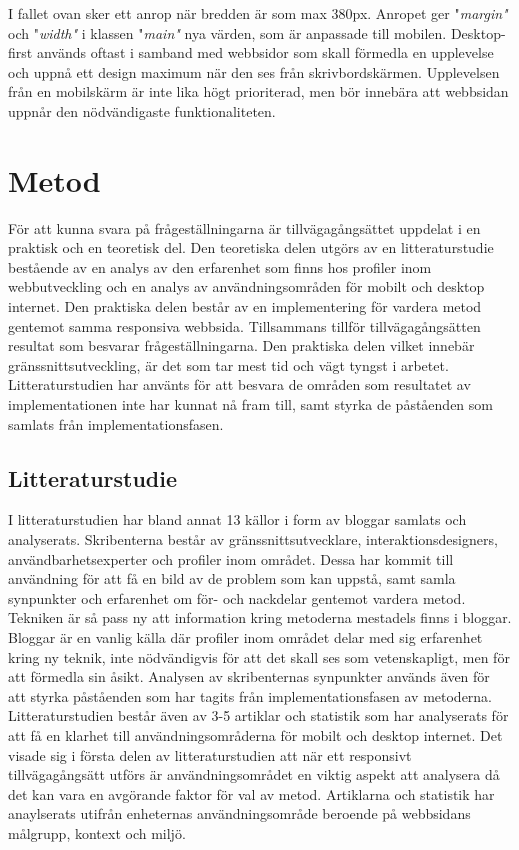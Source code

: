 \documentclass[11pt]{article}
\begin{document}
I fallet ovan sker ett anrop när bredden är som max 380px. Anropet ger "\textit{margin"} och "\textit{width"} i klassen "\textit{main"} nya värden, som är anpassade till mobilen. Desktop-first används oftast i samband med webbsidor som skall förmedla en upplevelse och uppnå ett design maximum när den ses från skrivbordskärmen. Upplevelsen från en mobilskärm är inte lika högt prioriterad, men bör innebära att webbsidan uppnår den nödvändigaste funktionaliteten.
\newpage

\section{Metod}
För att kunna svara på frågeställningarna är tillvägagångsättet uppdelat i en praktisk och en teoretisk del. Den teoretiska delen utgörs av en litteraturstudie bestående av en analys av den erfarenhet som finns hos profiler inom webbutveckling och en analys av användningsområden för mobilt och desktop internet. Den praktiska delen består av en implementering för vardera metod gentemot samma responsiva webbsida. Tillsammans tillför tillvägagångsätten resultat som besvarar frågeställningarna. Den praktiska delen vilket innebär gränssnittsutveckling, är det som tar mest tid och vägt tyngst i arbetet. Litteraturstudien har använts för att besvara de områden som resultatet av implementationen inte har kunnat nå fram till, samt styrka de påståenden som samlats från implementationsfasen.

\subsection{Litteraturstudie}
I litteraturstudien har bland annat 13 källor i form av bloggar samlats och analyserats. Skribenterna består av gränssnittsutvecklare, interaktionsdesigners, användbarhetsexperter och profiler inom området. Dessa har kommit till användning för att få en bild av de problem som kan uppstå, samt samla synpunkter och erfarenhet om för- och nackdelar gentemot vardera metod. Tekniken är så pass ny att information kring metoderna mestadels finns i bloggar. Bloggar är en vanlig källa där profiler inom området delar med sig erfarenhet kring ny teknik, inte nödvändigvis för att det skall ses som vetenskapligt, men för att förmedla sin åsikt. Analysen av skribenternas synpunkter används även för att styrka påståenden som har tagits från implementationsfasen av metoderna. Litteraturstudien består även av 3-5 artiklar och statistik som har analyserats för att få en klarhet till användningsområderna för mobilt och desktop internet. Det visade sig i första delen av litteraturstudien att när ett responsivt tillvägagångsätt utförs är användningsområdet en viktig aspekt att analysera då det kan vara en avgörande faktor för val av metod. Artiklarna och statistik har anaylserats utifrån enheternas användningsområde beroende på webbsidans målgrupp, kontext och miljö.
\end{document}
